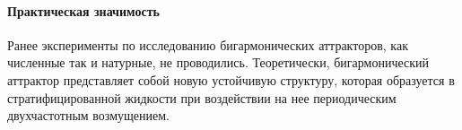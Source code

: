 





\paragraph{Практическая значимость} 

Ранее эксперименты по исследованию бигармонических аттракторов, как численные так и натурные, не проводились. Теоретически, бигармонический аттрактор представляет собой новую устойчивую структуру, которая образуется в стратифицированной жидкости при воздействии на нее периодическим двухчастотным возмущением.


